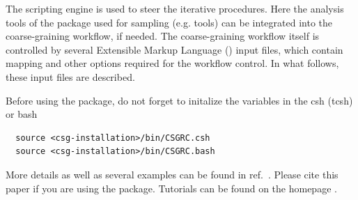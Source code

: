 The scripting engine is used to steer the iterative procedures. Here the analysis tools of the package used for sampling (e.g. \gromacs tools) can be integrated into the coarse-graining workflow, if needed. The coarse-graining workflow itself is controlled by several Extensible Markup Language (\xml) input files, which contain mapping and other options required for the workflow control. In what follows, these input files are described.

Before using the package, do not forget to initalize the variables in the csh (tcsh) or bash
\begin{verbatim}
  source <csg-installation>/bin/CSGRC.csh
  source <csg-installation>/bin/CSGRC.bash
\end{verbatim}

More details as well as several examples can be found in ref.~\cite{Ruehle:2009.a}. Please cite this paper if you are using the package. Tutorials can be found on the \votca homepage \votcaweb.
